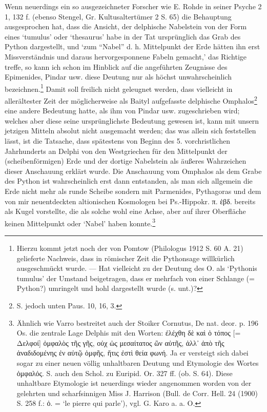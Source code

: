 \documentclass[a4paper, 11pt, oneside]{article}
\begin{document}
Wenn neuerdings ein so ausgezeichneter Forscher wie E. Rohde in seiner Psyche 2 1, 132 f. (ebenso Stengel, Gr. Kultusaltertümer 2 S. 65) die Behauptung ausgesprochen hat, dass die Ansicht, der delphische Nabelstein von der Form eines `tumulus' oder `thesaurus' habe in der Tat ursprünglich das Grab des Python dargestellt, und `zum "`Nabel"' d. h. Mittelpunkt der Erde hätten ihn erst Missverständnis und daraus hervorgesponnene Fabeln gemacht,' das Richtige treffe, so kann ich schon im Hinblick auf die angeführten Zeugnisse des Epimenides, Pindar usw. diese Deutung nur als höchst unwahrscheinlich bezeichnen.\footnote{Hierzu kommt jetzt noch der von Pomtow (Philologus 1912 S. 60 A. 21) gelieferte Nachweis, dass in römischer Zeit die Pythonsage willkürlich ausgeschmückt wurde. --- Hat vielleicht zu der Deutung des O. als `Pythonis tumulus' der Umstand beigetragen, dass er mehrfach von einer Schlange (= Python?) umringelt und hohl dargestellt wurde (s. unt.)?} Damit soll freilich nicht geleugnet werden, dass vielleicht in allerältester Zeit der möglicherweise als Baityl aufgefasste delphische Omphalos\footnote{S. jedoch unten Paus. 10, 16, 3.} eine andere Bedeutung hatte, als ihm von Pindar usw. zugeschrieben wird; welches aber diese seine ursprünglichste Bedeutung gewesen ist, kann mit unsern jetzigen Mitteln absolut nicht ausgemacht werden; das was allein sich feststellen lässt, ist die Tatsache, dass spätestens von Beginn des 5. vorchristlichen Jahrhunderts an Delphi von den Westgriechen für den Mittelpunkt der (scheibenförmigen) Erde und der dortige Nabelstein als äußeres Wahrzeichen dieser Anschauung erklärt wurde. Die Anschauung vom Omphalos als dem Grabe des Python ist wahrscheinlich erst dann entstanden, als man sich allgemein die Erde nicht mehr als runde Scheibe sondern mit Parmenides, Pythagoras und dem von mir neuentdeckten altionischen Kosmologen bei Ps.-Hippokr. π. ἑβδ. bereits als Kugel vorstellte, die als solche wohl eine Achse, aber auf ihrer Oberfläche keinen Mittelpunkt oder `Nabel' haben konnte.\footnote{Ähnlich wie Varro bestreitet auch der Stoiker Cornutus, De nat. deor. p. 196 Os. die zentrale Lage Delphis mit den Worten: ἐλέχθη δὲ καὶ ὁ τόπος [= Δελφοί] ὀμφαλὸς τῆς γῆς, οὐχ ὡς μεσαίτατος ὢν αὐτῆς, ἀλλ᾽ ἀπὸ τῆς ἀναδιδομένης ἐν αὐτῷ ὀμφῆς, ἥτις ἐστὶ θεία φωνή. Ja er versteigt sich dabei sogar zu einer neuen völlig unhaltbaren Deutung und Etymologie des Wortes ὀμφαλός. S. auch den Schol. zu Euripid. Or. 327 ff. (ob. S. 64). Diese unhaltbare Etymologie ist neuerdings wieder angenommen worden von der gelehrten und scharfsinnigen Miss J. Harrison (Bull. de Corr. Hell. 24 (1900) S. 258 f.: ὀ. = `le pierre qui parle'), vgl. G. Karo a. a. O.}
\end{document}
